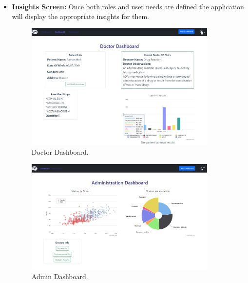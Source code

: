 \begin{itemize}
    \newpage
    \item \textbf{Insights Screen:}
     Once both roles and user needs are defined the application will display the appropriate insights for them.
    \begin{figure}[h!]
        \center
        \includegraphics[width=0.90\textwidth]{images/chapter4/application/docDashboard.PNG}
        \caption{Doctor Dashboard.}
        \label{fig:doctor}
    \end{figure}
    \begin{figure}[h!]
      \center
      \includegraphics[width=0.90\textwidth]{images/chapter4/application/admindasboard.PNG}
      \caption{Admin Dashboard.}
      \label{fig:admin}
  \end{figure}
\end{itemize}